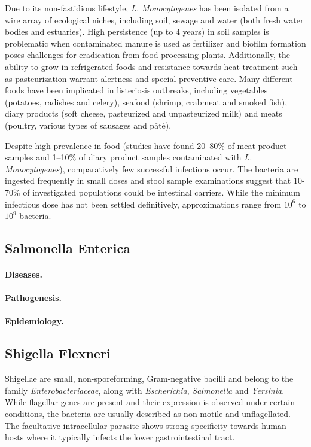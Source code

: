 Due to its non-fastidious lifestyle, \textit{L. Monocytogenes} has been isolated from a wire array of ecological niches, including soil, sewage and water (both fresh water bodies and estuaries). High persistence (up to 4 years) in soil samples is problematic when contaminated manure is used as fertilizer and biofilm formation poses challenges for eradication from food processing plants. Additionally, the ability to grow in refrigerated foods and resistance towards heat treatment such as pasteurization warrant alertness and special preventive care. Many different foods have been implicated in listeriosis outbreaks, including vegetables (potatoes, radishes and celery), seafood (shrimp, crabmeat and smoked fish), diary products (soft cheese, pasteurized and unpasteurized milk) and meats (poultry, various types of sausages and pâté).

Despite high prevalence in food (studies have found 20--80\% of meat product samples and 1--10\% of diary product samples contaminated with \textit{L. Monocytogenes}), comparatively few successful infections occur. The bacteria are ingested frequently in small doses and stool sample examinations suggest that 10-70\% of investigated populations could be intestinal carriers. While the minimum infectious dose has not been settled definitively, approximations range from $10^6$ to $10^9$ bacteria.

\subsection{Salmonella Enterica}
\paragraph{Diseases.}
\paragraph{Pathogenesis.}
\paragraph{Epidemiology.}

\subsection{Shigella Flexneri}
Shigellae are small, non-sporeforming, Gram-negative bacilli and belong to the family \textit{Enterobacteriaceae}, along with \textit{Escherichia}, \textit{Salmonella} and \textit{Yersinia}. While flagellar genes are present and their expression is observed under certain conditions, the bacteria are usually described as non-motile and unflagellated. The facultative intracellular parasite shows strong specificity towards human hosts where it typically infects the lower gastrointestinal tract.


